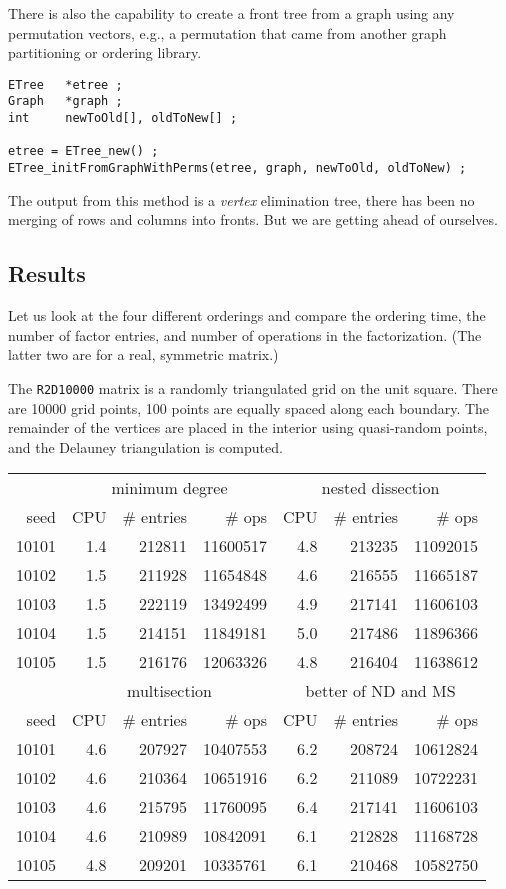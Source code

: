 There is also the capability to create a front tree from a graph
using any permutation vectors, e.g., a permutation that came from
another graph partitioning or ordering library.
\begin{verbatim}
ETree   *etree ;
Graph   *graph ;
int     newToOld[], oldToNew[] ;

etree = ETree_new() ;
ETree_initFromGraphWithPerms(etree, graph, newToOld, oldToNew) ;
\end{verbatim}
The output from this method is a {\it vertex} elimination tree,
there has been no merging of rows and columns into fronts.
But we are getting ahead of ourselves.
\par
\subsection{Results}
\label{subsection:results}
\par
Let us look at the four different orderings and compare the
ordering time, the number of factor entries, and number of
operations in the factorization.
(The latter two are for a real, symmetric matrix.)
\par
The {\tt R2D10000} matrix is a randomly triangulated grid on the
unit square. There are 10000 grid points, 100 points are equally
spaced along each boundary.
The remainder of the vertices are placed in the interior using 
quasi-random points, and the Delauney triangulation is computed.
\begin{center}
\begin{tabular}{rrrrrrr}
& \multicolumn{3}{c}{minimum degree} 
& \multicolumn{3}{c}{nested dissection} \\
seed & CPU & \# entries & \# ops & CPU & \# entries & \# ops \\
10101 & 1.4 & 212811 & 11600517 & 4.8 & 213235 & 11092015 \\
10102 & 1.5 & 211928 & 11654848 & 4.6 & 216555 & 11665187 \\
10103 & 1.5 & 222119 & 13492499 & 4.9 & 217141 & 11606103 \\
10104 & 1.5 & 214151 & 11849181 & 5.0 & 217486 & 11896366 \\
10105 & 1.5  & 216176 & 12063326 & 4.8 & 216404 & 11638612 \\
& \multicolumn{3}{c}{multisection} 
& \multicolumn{3}{c}{better of ND and MS} \\
seed & CPU & \# entries & \# ops & CPU & \# entries & \# ops \\
10101 & 4.6 & 207927 & 10407553 & 6.2 & 208724 & 10612824 \\
10102 & 4.6 & 210364 & 10651916 & 6.2 & 211089 & 10722231 \\
10103 & 4.6 & 215795 & 11760095 & 6.4 & 217141 & 11606103 \\
10104 & 4.6 & 210989 & 10842091 & 6.1 & 212828 & 11168728 \\
10105 & 4.8 & 209201 & 10335761 & 6.1 & 210468 & 10582750
\end{tabular}
\end{center}
